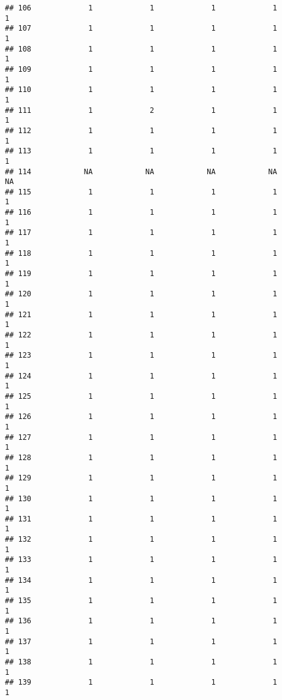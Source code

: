 \documentclass[
]{article}
\begin{document}
\begin{verbatim}
## 106             1             1             1             1             1
## 107             1             1             1             1             1
## 108             1             1             1             1             1
## 109             1             1             1             1             1
## 110             1             1             1             1             1
## 111             1             2             1             1             1
## 112             1             1             1             1             1
## 113             1             1             1             1             1
## 114            NA            NA            NA            NA            NA
## 115             1             1             1             1             1
## 116             1             1             1             1             1
## 117             1             1             1             1             1
## 118             1             1             1             1             1
## 119             1             1             1             1             1
## 120             1             1             1             1             1
## 121             1             1             1             1             1
## 122             1             1             1             1             1
## 123             1             1             1             1             1
## 124             1             1             1             1             1
## 125             1             1             1             1             1
## 126             1             1             1             1             1
## 127             1             1             1             1             1
## 128             1             1             1             1             1
## 129             1             1             1             1             1
## 130             1             1             1             1             1
## 131             1             1             1             1             1
## 132             1             1             1             1             1
## 133             1             1             1             1             1
## 134             1             1             1             1             1
## 135             1             1             1             1             1
## 136             1             1             1             1             1
## 137             1             1             1             1             1
## 138             1             1             1             1             1
## 139             1             1             1             1             1

\end{verbatim}
\end{document}
